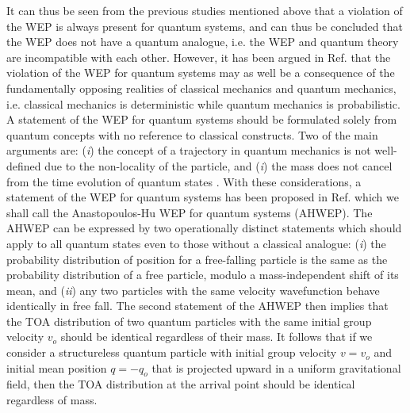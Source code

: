 \documentclass[%
 reprint,
 amsmath,amssymb,
 aps,
]{revtex4-1}
\begin{document}
It can thus be seen from the previous studies mentioned above that a violation of the WEP is always present for quantum systems, and can thus be concluded that the WEP does not have a quantum analogue, i.e. the WEP and quantum theory are incompatible with each other. However, it has been argued in Ref. \cite{statement} that the violation of the WEP for quantum systems may as well be a consequence of the fundamentally opposing realities of classical mechanics and quantum mechanics, i.e. classical mechanics is deterministic while quantum mechanics is probabilistic. A statement of the WEP for quantum systems should be formulated solely from quantum concepts with no reference to classical constructs. Two of the main arguments are: ({\it i}) the concept of a trajectory in quantum mechanics is not well-defined due to the non-locality of the particle, and ({\it i}) the mass does not cancel from the time evolution of quantum states \cite{zych_brukner,statement}. With these considerations, a statement of the WEP for quantum systems has been proposed in Ref. \cite{statement} which we shall call the Anastopoulos-Hu WEP for quantum systems (AHWEP). The AHWEP can be expressed by two operationally distinct statements which should apply to all quantum states even to those without a classical analogue: ({\it i}) the probability distribution of position for a free-falling particle is the same as the probability distribution of a free particle, modulo a mass-independent shift of its mean, and ({\it ii}) any two particles with the same velocity wavefunction behave identically in free fall. The second statement of the AHWEP then implies that the TOA distribution of two quantum particles with the same initial group velocity $v_o$ should be identical regardless of their mass. It follows that if we consider a structureless quantum particle with initial group velocity $v=v_o$ and initial mean position $q=-q_o$ that is projected upward in a uniform gravitational field, then the TOA distribution at the arrival point should be identical regardless of mass. 
\end{document}
